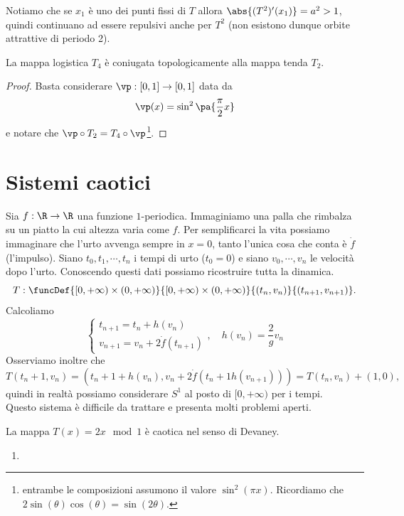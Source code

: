 \begin{example}
\begin{itemize}
Notiamo che se $x_1$ \`e uno dei punti fissi di $T$ allora $\abs{(T^2)'(x_1)}=a^2>1$, quindi continuano ad essere repulsivi anche per $T^2$ (non esistono dunque orbite attrattive di periodo 2).
\end{itemize}
\setlength{\leftmargini}{0.5cm}
\end{example}
    
\begin{remark}
La mappa logistica $T_4$ \`e coniugata topologicamente alla mappa tenda $T_2$.
\end{remark}
\begin{proof}
Basta considerare $\vp:[0,1]\to [0,1]$ data da
\[\vp(x)=\sin^2\pa{\frac\pi2x}\]
e notare che $\vp\circ T_2=T_4\circ \vp$\footnote{entrambe le composizioni assumono il valore $\sin^2(\pi x)$. Ricordiamo che $2\sin(\theta)\cos(\theta)=\sin(2\theta)$.}.
\end{proof}

\section{Sistemi caotici}
\begin{example}
Sia $f:\R\to \R$ una funzione $1$-periodica. Immaginiamo una palla che rimbalza su un piatto la cui altezza varia come $f$. Per semplificarci la vita possiamo immaginare che l'urto avvenga sempre in $x=0$, tanto l'unica cosa che conta \`e $\dot f$ (l'impulso). Siano $t_0,t_1,\cdots,t_n$ i tempi di urto ($t_0=0$) e siano $v_0,\cdots,v_n$ le velocit\`a dopo l'urto. Conoscendo questi dati possiamo ricostruire tutta la dinamica.
\[T:\funcDef{[0,+\infty)\times (0,+\infty)}{[0,+\infty)\times (0,+\infty)}{(t_{n},v_n)}{(t_{n+1},v_{n+1})}.\]
Calcoliamo
\[\begin{cases}
t_{n+1}=t_n+h(v_n)\\
v_{n+1}=v_n+2\dot f(t_{n+1})
\end{cases},\quad h(v_n)=\frac 2gv_n\]
Osserviamo inoltre che
\[T(t_n+1,v_n)=(t_n+1+h(v_n), v_n+2\dot f(t_n+1 h(v_{n+1})))=T(t_n,v_n)+(1,0),\]
quindi in realt\`a possiamo considerare $S^1$ al posto di $[0,+\infty)$ per i tempi.\\
Questo sistema \`e difficile da trattare e presenta molti problemi aperti.
\end{example}


\begin{example}
La mappa $T(x)=2x\mod 1$ \`e caotica nel senso di Devaney.
\begin{enumerate}
\item 
\end{enumerate}
\end{example}

